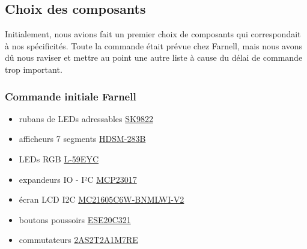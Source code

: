 \documentclass[12pt]{report}
\begin{document}
	\subsection{Choix des composants}
	Initialement, nous avions fait un premier choix de composants qui correspondait à nos spécificités. Toute la commande était prévue chez Farnell, mais nous avons dû nous raviser et mettre au point une autre liste à cause du délai de commande trop important.\\
	\subsubsection{Commande initiale Farnell}
	\begin{itemize}[label=$-$]
		\item rubans de LEDs adressables \href{https://fr.aliexpress.com/item/1005006918408592.html?spm=a2g0o.productlist.main.19.fbb0788296kxRo&algo_pvid=72d2c9a9-ec47-4e4b-9d14-7e90be35485c&algo_exp_id=72d2c9a9-ec47-4e4b-9d14-7e90be35485c-9&pdp_npi=4%40dis!EUR!18.92!18.92!!!145.68!145.68!%402103888a17169934968957029e0b2f!12000038723750387!sea!FR!0!AB&curPageLogUid=lAauznpLAY1Y&utparam-url=scene%3Asearch%7Cquery_from%3A}{SK9822}\\
		\item afficheurs 7 segments \href{https://fr.farnell.com/broadcom-limited/hdsm-283b/afficheur-a-led-cms-7mm-bleu-cc/dp/1659312}{HDSM-283B}\\
		\item LEDs RGB \href{https://fr.farnell.com/kingbright/l-59eyc/led-5mm-tricolore/dp/1168662}{L-59EYC}\\
		\item expandeurs IO - I²C \href{https://fr.farnell.com/microchip/mcp23017-e-sp/16-bit-expander-i-o-i2c-i-f/dp/1332088}{MCP23017}\\
		\item écran LCD I2C \href{https://fr.farnell.com/midas/mc21605c6w-bnmlwi-v2/afficheur-alphanumerique-16x2/dp/2748649}{MC21605C6W-BNMLWI-V2}\\
		\item boutons poussoirs \href{https://fr.farnell.com/panasonic/ese20c321/commutateur-bouton-pouss-momentane/dp/2079613}{ESE20C321}\\
		\item commutateurs \href{https://fr.farnell.com/multicomp/2as2t2a1m7re/switch-toggle-spdt-on-mom/dp/1550118}{2AS2T2A1M7RE}\\
	\end{itemize}
\end{document}
